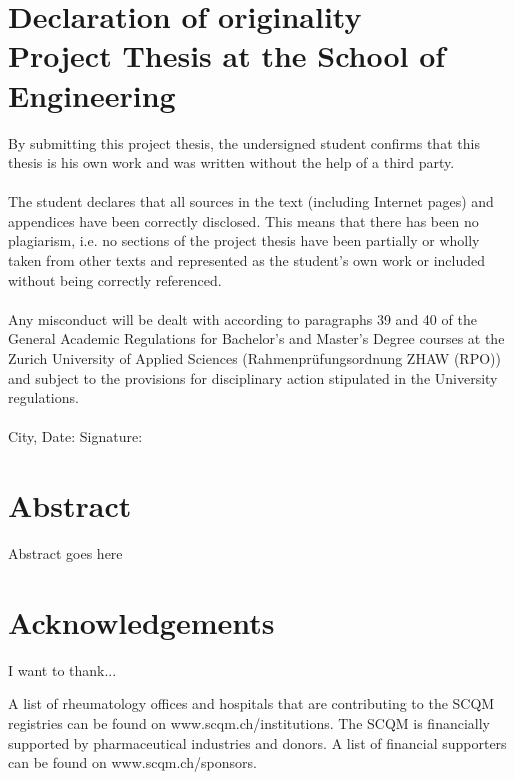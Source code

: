 \documentclass[12pt]{article}
\begin{document}
\section*{Declaration of originality\\ \large{Project Thesis at the School of Engineering}}
By submitting this project thesis, the undersigned student confirms that this thesis is his own work and was written without the help of a third party. \\
\\
The student declares that all sources in the text (including Internet pages) and appendices have been correctly disclosed. This means that there has been no plagiarism, i.e. no sections of the project thesis have been partially or wholly taken from other texts and represented as the student’s own work or included without being correctly referenced. \\
\\
Any misconduct will be dealt with according to paragraphs 39 and 40 of the General Academic Regulations for Bachelor’s and Master’s Degree courses at the Zurich University of Applied Sciences (Rahmenprüfungsordnung ZHAW (RPO)) and subject to the provisions for disciplinary action stipulated in the University regulations.\\
\vspace{3cm} \\
City, Date: \hspace{5cm} Signature:

\newpage

\section*{Abstract}
Abstract goes here

\newpage

\section*{Acknowledgements}
I want to thank...

A list of rheumatology offices and hospitals that are contributing to the SCQM registries can be found on www.scqm.ch/institutions. The SCQM is financially supported by pharmaceutical industries and donors. A list of financial supporters can be found on www.scqm.ch/sponsors.

\newpage

\tableofcontents

\newpage
\end{document}
